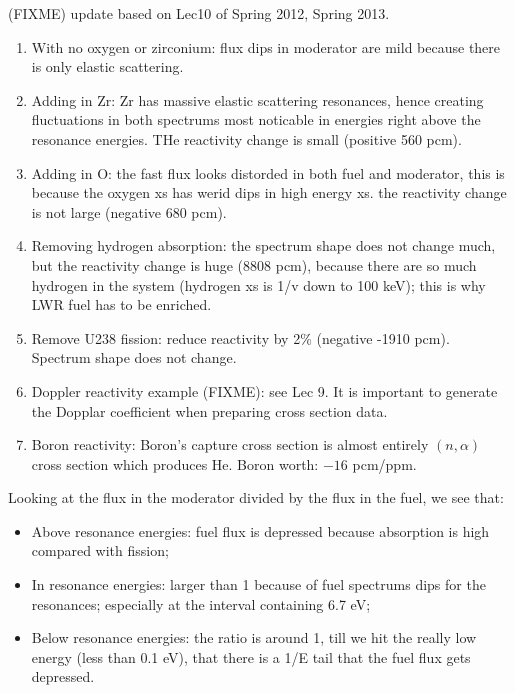 \documentclass{school-22.211-notes}
\date{March  7, 2012}
\begin{document}
\maketitle

(FIXME) update based on Lec10 of Spring 2012, Spring 2013. 
\begin{enumerate}
\item With no oxygen or zirconium: flux dips in moderator are mild because there is only elastic scattering. 
\item Adding in Zr: Zr has massive elastic scattering resonances, hence creating fluctuations in both spectrums most noticable in energies right above the resonance energies. THe reactivity change is small (positive 560 pcm).
\item Adding in O: the fast flux looks distorded in both fuel and moderator, this is because the oxygen xs has werid dips in high energy xs. the reactivity change is not large (negative 680 pcm). 
\item Removing hydrogen absorption: the spectrum shape does not change much, but the reactivity change is huge (8808 pcm), because there are so much hydrogen in the system (hydrogen xs is 1/v down to 100 keV); this is why LWR fuel has to be enriched. 
\item Remove U238 fission: reduce reactivity by 2\% (negative -1910 pcm). Spectrum shape does not change. 
\item Doppler reactivity example (FIXME): see Lec 9. It is important to generate the Dopplar coefficient when preparing cross section data. 
\item Boron reactivity: Boron's capture cross section is almost entirely $(n,\alpha)$ cross section which produces He. Boron worth: $-16$ pcm/ppm. 
\end{enumerate}
Looking at the flux in the moderator divided by the flux in the fuel, we see that:
\begin{itemize}
\item Above resonance energies: fuel flux is depressed because absorption is high compared with fission; 
\item In resonance energies: larger than 1 because of fuel spectrums dips for the resonances; especially at the interval containing 6.7 eV;
\item Below resonance energies: the ratio is around 1, till we hit the really low energy (less than 0.1 eV), that there is a 1/E tail that the fuel flux gets depressed. 
\end{itemize}
\end{document}
